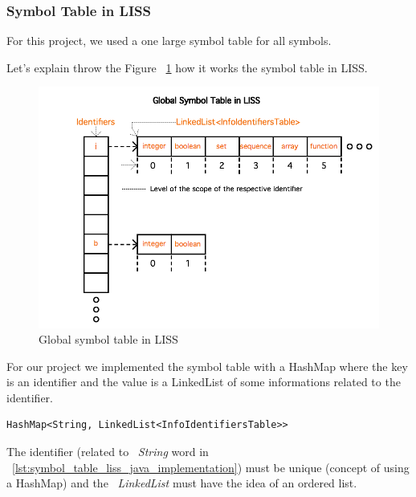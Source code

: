 \documentclass[
  oneside,
  11pt, a4paper,
  footinclude=true,
  headinclude=true,
  cleardoublepage=empty
]{scrbook}
\begin{document}

\newpage

\subsubsection{Symbol Table in LISS}

For this project, we used a one large symbol table for all symbols.

Let's explain throw the Figure ~\ref{fig:global_symbol_table_liss} how it works the symbol table in LISS.

\begin{figure}[h!]
  \centering
    \includegraphics[width=1\textwidth]{img/global_symbol_table.png}
    \caption{Global symbol table in LISS}
    \label{fig:global_symbol_table_liss}
\end{figure}

For our project we implemented the symbol table with a HashMap where the key is an identifier and the value is a LinkedList of some informations related to the identifier.

\begin{lstlisting}[caption={Data structure of the symbol table in LISS},label={lst:symbol_table_liss_java_implementation}]
	HashMap<String, LinkedList<InfoIdentifiersTable>>
\end{lstlisting}

The identifier (related to ~\textit{String} word in ~\ref{lst:symbol_table_liss_java_implementation}) must be unique (concept of using a HashMap) and the ~\textit{LinkedList} must have the idea of an ordered list.
\end{document}
